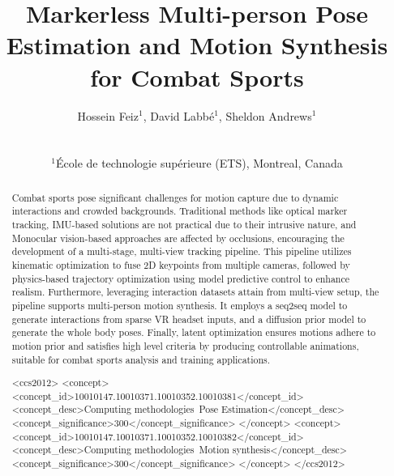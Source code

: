 \documentclass{egpubl}
\title[EG poster]%
      {Markerless Multi-person Pose Estimation and Motion Synthesis for Combat Sports}
\author[Hossein]
{\parbox{\textwidth}{\centering 
        Hossein Feiz$^1$, David Labbé$^1$, Sheldon Andrews$^1$
        }
        \\
{\parbox{\textwidth}{\centering 
        $^1$École de technologie supérieure (ETS), Montreal, Canada
       }
}
}
\begin{document}

\maketitle

\begin{abstract}
   Combat sports pose significant challenges for motion capture due to dynamic interactions and crowded backgrounds. Traditional methods like optical marker tracking, IMU-based solutions are not practical due to their intrusive nature, and Monocular vision-based approaches are affected by occlusions, encouraging the development of a multi-stage, multi-view tracking pipeline. This pipeline utilizes kinematic optimization to fuse 2D keypoints from multiple cameras, followed by physics-based trajectory optimization using model predictive control to enhance realism.
   Furthermore, leveraging interaction datasets attain from multi-view setup, the pipeline supports multi-person motion synthesis. It employs a seq2seq model to generate interactions from sparse VR headset inputs, and a diffusion prior model to generate the whole body poses. Finally, latent optimization ensures motions adhere to motion prior and satisfies high level criteria by producing controllable animations, suitable for combat sports analysis and training applications.

\begin{CCSXML}
<ccs2012>
<concept>
<concept_id>10010147.10010371.10010352.10010381</concept_id>
<concept_desc>Computing methodologies~Pose Estimation</concept_desc>
<concept_significance>300</concept_significance>
</concept>
<concept>
<concept_id>10010147.10010371.10010352.10010382</concept_id>
<concept_desc>Computing methodologies~Motion synthesis</concept_desc>
<concept_significance>300</concept_significance>
</concept>
</ccs2012>
\end{CCSXML}



\printccsdesc   
\end{abstract}  
\end{document}
